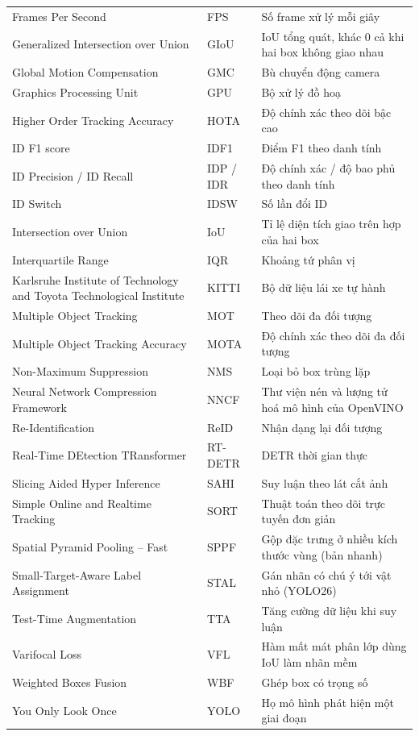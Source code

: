 \begin{longtable}{P{6.2cm}>{\centering\arraybackslash}p{2.3cm}P{5.2cm}}
  \\ \rowsep
Frames Per Second & FPS & Số frame xử lý mỗi giây \\ \rowsep
Generalized Intersection over Union & GIoU & IoU tổng quát, khác 0 cả khi hai box không giao nhau \\ \rowsep
Global Motion Compensation & GMC & Bù chuyển động camera \\ \rowsep
Graphics Processing Unit & GPU & Bộ xử lý đồ hoạ \\ \rowsep
Higher Order Tracking Accuracy & HOTA & Độ chính xác theo dõi bậc cao \\ \rowsep
ID F1 score & IDF1 & Điểm F1 theo danh tính \\ \rowsep
ID Precision / ID Recall & IDP / IDR & Độ chính xác / độ bao phủ theo danh tính \\ \rowsep
ID Switch & IDSW & Số lần đổi ID \\ \rowsep
Intersection over Union & IoU & Tỉ lệ diện tích giao trên hợp của hai box \\ \rowsep
Interquartile Range & IQR & Khoảng tứ phân vị \\ \rowsep
Karlsruhe Institute of Technology and Toyota Technological Institute & KITTI & Bộ dữ liệu lái xe tự hành \\ \rowsep
Multiple Object Tracking & MOT & Theo dõi đa đối tượng \\ \rowsep
Multiple Object Tracking Accuracy & MOTA & Độ chính xác theo dõi đa đối tượng \\ \rowsep
Non-Maximum Suppression & NMS & Loại bỏ box trùng lặp \\ \rowsep
Neural Network Compression Framework & NNCF & Thư viện nén và lượng tử hoá mô hình của OpenVINO \\ \rowsep
Re-Identification & ReID & Nhận dạng lại đối tượng \\ \rowsep
Real-Time DEtection TRansformer & RT-DETR & DETR thời gian thực \\ \rowsep
Slicing Aided Hyper Inference & SAHI & Suy luận theo lát cắt ảnh \\ \rowsep
Simple Online and Realtime Tracking & SORT & Thuật toán theo dõi trực tuyến đơn giản \\ \rowsep
Spatial Pyramid Pooling -- Fast & SPPF & Gộp đặc trưng ở nhiều kích thước vùng (bản nhanh) \\ \rowsep
Small-Target-Aware Label Assignment & STAL & Gán nhãn có chú ý tới vật nhỏ (YOLO26) \\ \rowsep
Test-Time Augmentation & TTA & Tăng cường dữ liệu khi suy luận \\ \rowsep
Varifocal Loss & VFL & Hàm mất mát phân lớp dùng IoU làm nhãn mềm \\ \rowsep
Weighted Boxes Fusion & WBF & Ghép box có trọng số \\ \rowsep
You Only Look Once & YOLO & Họ mô hình phát hiện một giai đoạn \\ \bottomrule
\end{longtable}
\endgroup
